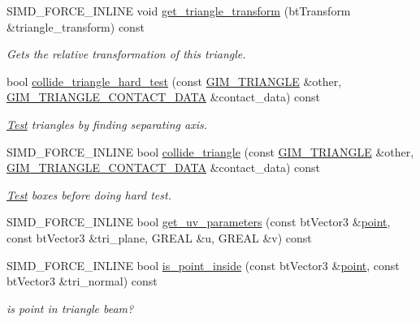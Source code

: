 \begin{DoxyCompactItemize}
\item 
S\+I\+M\+D\+\_\+\+F\+O\+R\+C\+E\+\_\+\+I\+N\+L\+I\+N\+E void \hyperlink{class_g_i_m___t_r_i_a_n_g_l_e_a500db747a4c740b3de1756336263a53d}{get\+\_\+triangle\+\_\+transform} (bt\+Transform \&triangle\+\_\+transform) const 
\begin{DoxyCompactList}\small\item\em Gets the relative transformation of this triangle. \end{DoxyCompactList}\item 
bool \hyperlink{class_g_i_m___t_r_i_a_n_g_l_e_a0ec3d21ba17dec3cfecbe8ff34b85072}{collide\+\_\+triangle\+\_\+hard\+\_\+test} (const \hyperlink{class_g_i_m___t_r_i_a_n_g_l_e}{G\+I\+M\+\_\+\+T\+R\+I\+A\+N\+G\+L\+E} \&other, \hyperlink{struct_g_i_m___t_r_i_a_n_g_l_e___c_o_n_t_a_c_t___d_a_t_a}{G\+I\+M\+\_\+\+T\+R\+I\+A\+N\+G\+L\+E\+\_\+\+C\+O\+N\+T\+A\+C\+T\+\_\+\+D\+A\+T\+A} \&contact\+\_\+data) const 
\begin{DoxyCompactList}\small\item\em \hyperlink{class_test}{Test} triangles by finding separating axis. \end{DoxyCompactList}\item 
S\+I\+M\+D\+\_\+\+F\+O\+R\+C\+E\+\_\+\+I\+N\+L\+I\+N\+E bool \hyperlink{class_g_i_m___t_r_i_a_n_g_l_e_a42749c17088408842a97534559b9d1f2}{collide\+\_\+triangle} (const \hyperlink{class_g_i_m___t_r_i_a_n_g_l_e}{G\+I\+M\+\_\+\+T\+R\+I\+A\+N\+G\+L\+E} \&other, \hyperlink{struct_g_i_m___t_r_i_a_n_g_l_e___c_o_n_t_a_c_t___d_a_t_a}{G\+I\+M\+\_\+\+T\+R\+I\+A\+N\+G\+L\+E\+\_\+\+C\+O\+N\+T\+A\+C\+T\+\_\+\+D\+A\+T\+A} \&contact\+\_\+data) const 
\begin{DoxyCompactList}\small\item\em \hyperlink{class_test}{Test} boxes before doing hard test. \end{DoxyCompactList}\item 
S\+I\+M\+D\+\_\+\+F\+O\+R\+C\+E\+\_\+\+I\+N\+L\+I\+N\+E bool \hyperlink{class_g_i_m___t_r_i_a_n_g_l_e_acbd27931f5431435ecce5576de18924b}{get\+\_\+uv\+\_\+parameters} (const bt\+Vector3 \&\hyperlink{structpoint}{point}, const bt\+Vector3 \&tri\+\_\+plane, G\+R\+E\+A\+L \&u, G\+R\+E\+A\+L \&v) const 
\item 
S\+I\+M\+D\+\_\+\+F\+O\+R\+C\+E\+\_\+\+I\+N\+L\+I\+N\+E bool \hyperlink{class_g_i_m___t_r_i_a_n_g_l_e_a921acb2a97263653fce72384f177a953}{is\+\_\+point\+\_\+inside} (const bt\+Vector3 \&\hyperlink{structpoint}{point}, const bt\+Vector3 \&tri\+\_\+normal) const 
\begin{DoxyCompactList}\small\item\em is point in triangle beam? \end{DoxyCompactList}\item 

\end{DoxyCompactItemize}
